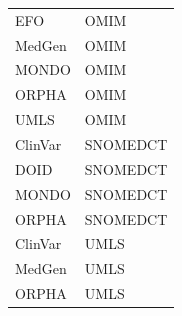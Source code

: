 \documentclass[9pt,a4paper,]{extarticle}
\begin{document}
\begin{table}
\begin{tabular}[t]{ll}
EFO & OMIM\\
MedGen & OMIM\\
MONDO & OMIM\\
ORPHA & OMIM\\
\addlinespace
UMLS & OMIM\\
ClinVar & SNOMEDCT\\
DOID & SNOMEDCT\\
MONDO & SNOMEDCT\\
ORPHA & SNOMEDCT\\
\addlinespace
ClinVar & UMLS\\
MedGen & UMLS\\
ORPHA & UMLS\\
\bottomrule
\end{tabular}
\end{table}

\renewcommand\refname{References}
{\small}
\end{document}
